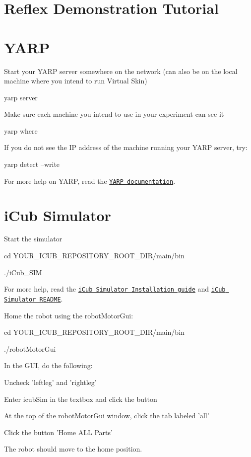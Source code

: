 \hypertarget{reflex_demo_title}{}\section{Reflex Demonstration Tutorial}\label{reflex_demo_title}
\hypertarget{reflex_demo_yarp}{}\section{YARP}\label{reflex_demo_yarp}
Start your YARP server somewhere on the network (can also be on the local machine where you intend to run Virtual Skin) \begin{DoxyVerb}yarp server \end{DoxyVerb}


Make sure each machine you intend to use in your experiment can see it \begin{DoxyVerb}yarp where \end{DoxyVerb}


If you do not see the IP address of the machine running your YARP server, try: \begin{DoxyVerb}yarp detect --write \end{DoxyVerb}
 For more help on YARP, read the \href{http://eris.liralab.it/yarpdoc/index.html}{\tt YARP documentation}.\hypertarget{reflex_demo_sim}{}\section{iCub Simulator}\label{reflex_demo_sim}
Start the simulator \begin{DoxyVerb}cd YOUR_ICUB_REPOSITORY_ROOT_DIR/main/bin \end{DoxyVerb}
 \begin{DoxyVerb}./iCub_SIM \end{DoxyVerb}
 For more help, read the \href{http://eris.liralab.it/wiki/ODE}{\tt iCub Simulator Installation guide} and \href{http://eris.liralab.it/wiki/Simulator_README}{\tt iCub Simulator README}.

Home the robot using the robotMotorGui: \begin{DoxyVerb}cd YOUR_ICUB_REPOSITORY_ROOT_DIR/main/bin \end{DoxyVerb}
 \begin{DoxyVerb}./robotMotorGui \end{DoxyVerb}
 In the GUI, do the following:
\begin{DoxyItemize}
\item Uncheck 'leftleg' and 'rightleg'
\item Enter {\ttfamily icubSim} in the textbox and click the button
\item At the top of the robotMotorGui window, click the tab labeled 'all'
\item Click the button 'Home ALL Parts'
\end{DoxyItemize}The robot should move to the home position.

